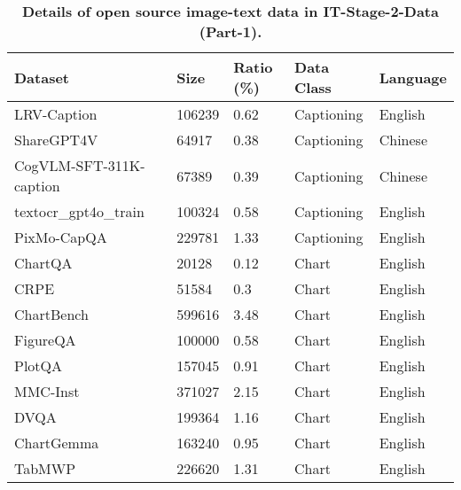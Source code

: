 \begin{table}[ht]
\centering
\caption{\textbf{Details of open source image-text data in IT-Stage-2-Data (Part-1).}
}
\label{tab:appendix_sft_s2_it_1}
\setlength{\tabcolsep}{7pt}
\begin{tabular}{l|l|l|l|l}
\toprule
Dataset                         & Size    & Ratio (\%) & Data Class    & Language        \\
\midrule
LRV-Caption~\cite{liu2023aligning}                 & 106239 & 0.62       & Captioning   & English         \\
ShareGPT4V~\cite{chen2023sharegpt4v}               & 64917  & 0.38       & Captioning   & Chinese         \\
CogVLM-SFT-311K-caption~\cite{wang2023cogvlm}      & 67389  & 0.39       & Captioning   & Chinese         \\
textocr\_gpt4o\_train~\cite{TextOCR-GPT4o}         & 100324 & 0.58       & Captioning   & English         \\
PixMo-CapQA~\cite{deitke2024molmo}                 & 229781 & 1.33       & Captioning   & English         \\
ChartQA~\cite{masry-etal-2022-chartqa}             & 20128  & 0.12       & Chart        & English         \\
CRPE~\cite{wang2023allseeing}                      & 51584  & 0.3        & Chart        & English         \\
ChartBench~\cite{ChartBench}                       & 599616 & 3.48       & Chart        & English         \\
FigureQA~\cite{kahou2017figureqa}                  & 100000 & 0.58       & Chart        & English         \\
PlotQA~\cite{Methani_2020_WACV}                  & 157045 & 0.91       & Chart        & English         \\
MMC-Inst~\cite{liu2023mmc}                         & 371027 & 2.15       & Chart        & English         \\
DVQA~\cite{kafle2018dvqa}                          & 199364 & 1.16       & Chart        & English         \\
ChartGemma~\cite{masry2024chartgemma}              & 163240 & 0.95       & Chart        & English         \\
TabMWP~\cite{lu2023dynamic}                        & 226620 & 1.31       & Chart        & English         \\

\end{tabular}
\end{table}
